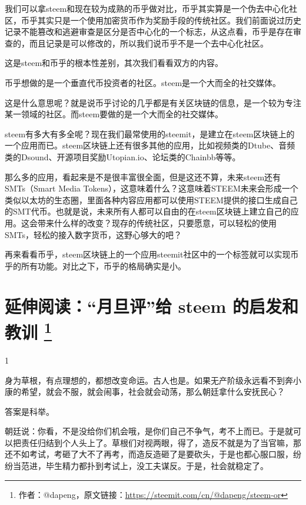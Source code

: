 \documentclass[]{ctexbook}
\begin{document}
我们可以拿steem和现在较为成熟的币乎做对比，币乎其实算是一个伪去中心化社区，币乎其实只是一个使用加密货币作为奖励手段的传统社区。我们前面说过历史记录不能篡改和逃避审查是区分是否中心化的一个标志，从这点看，币乎是存在审查的，而且记录是可以修改的，所以我们说币乎不是一个去中心化社区。

这是steem和币乎的根本性差别，其次我们看看双方的内容。

币乎想做的是一个垂直代币投资者的社区。steem是一个大而全的社交媒体。

这是什么意思呢？就是说币乎讨论的几乎都是有关区块链的信息，是一个较为专注某一领域的社区。而steem要做的是一个大而全的社交媒体。

steem有多大有多全呢？现在我们最常使用的steemit，是建立在steem区块链上的一个应用而已。steem区块链上还有很多其他的应用，比如视频类的Dtube、音频类的Dsound、开源项目奖励Utopian.io、论坛类的Chainbb等等。

那么多的应用，看起来是不是很丰富很全面，但是这还不算，未来steem还有SMTs（Smart Media Tokens），这意味着什么？这意味着STEEM未来会形成一个类似以太坊的生态圈，里面各种内容应用都可以使用STEEM提供的接口生成自己的SMT代币。也就是说，未来所有人都可以自由的在steem区块链上建立自己的应用。这会带来什么样的改变？现存的传统社区，只要愿意，可以轻松的使用SMTs，轻松的接入数字货币，这野心够大的吧？

再来看看币乎，steem区块链上的一个应用steemit社区中的一个标签就可以实现币乎的所有功能。对比之下，币乎的格局确实是小。

\hypertarget{cn-reader-lesson}{%
\section[延伸阅读：``月旦评''给 steem 的启发和教训 ]{\texorpdfstring{延伸阅读：``月旦评''给 steem 的启发和教训 \footnote{作者：@dapeng，原文链接：\url{https://steemit.com/cn/@dapeng/steem-or}}}{延伸阅读：``月旦评''给 steem 的启发和教训 }}\label{cn-reader-lesson}}

1

身为草根，有点理想的，都想改变命运。古人也是。如果无产阶级永远看不到奔小康的希望，就会不服，就会闹事，社会就会动荡，那么朝廷拿什么安抚民心？

答案是科举。

朝廷说：你看，不是没给你们机会哦，是你们自己不争气，考不上而已。于是就可以把责任归结到个人头上了。草根们对视两眼，得了，造反不就是为了当官嘛，那还不如考试，考砸了大不了再考，而造反造砸了是要砍头，于是也都心服口服，纷纷当范进，毕生精力都扑到考试上，没工夫谋反。于是，社会就稳定了。
\end{document}
